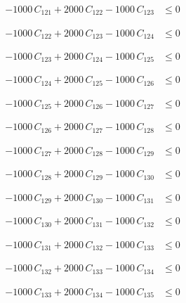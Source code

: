 \documentclass[a4paper,11pt]{article}
\begin{document}
\begin{align}
-1000\,C_{121} + 2000\,C_{122} - 1000\,C_{123} &\leq 0 \nonumber
\end{align}

\begin{align}
-1000\,C_{122} + 2000\,C_{123} - 1000\,C_{124} &\leq 0 \nonumber
\end{align}

\begin{align}
-1000\,C_{123} + 2000\,C_{124} - 1000\,C_{125} &\leq 0 \nonumber
\end{align}

\begin{align}
-1000\,C_{124} + 2000\,C_{125} - 1000\,C_{126} &\leq 0 \nonumber
\end{align}

\begin{align}
-1000\,C_{125} + 2000\,C_{126} - 1000\,C_{127} &\leq 0 \nonumber
\end{align}

\begin{align}
-1000\,C_{126} + 2000\,C_{127} - 1000\,C_{128} &\leq 0 \nonumber
\end{align}

\begin{align}
-1000\,C_{127} + 2000\,C_{128} - 1000\,C_{129} &\leq 0 \nonumber
\end{align}

\begin{align}
-1000\,C_{128} + 2000\,C_{129} - 1000\,C_{130} &\leq 0 \nonumber
\end{align}

\begin{align}
-1000\,C_{129} + 2000\,C_{130} - 1000\,C_{131} &\leq 0 \nonumber
\end{align}

\begin{align}
-1000\,C_{130} + 2000\,C_{131} - 1000\,C_{132} &\leq 0 \nonumber
\end{align}

\begin{align}
-1000\,C_{131} + 2000\,C_{132} - 1000\,C_{133} &\leq 0 \nonumber
\end{align}

\begin{align}
-1000\,C_{132} + 2000\,C_{133} - 1000\,C_{134} &\leq 0 \nonumber
\end{align}

\begin{align}
-1000\,C_{133} + 2000\,C_{134} - 1000\,C_{135} &\leq 0 \nonumber
\end{align}
\end{document}
